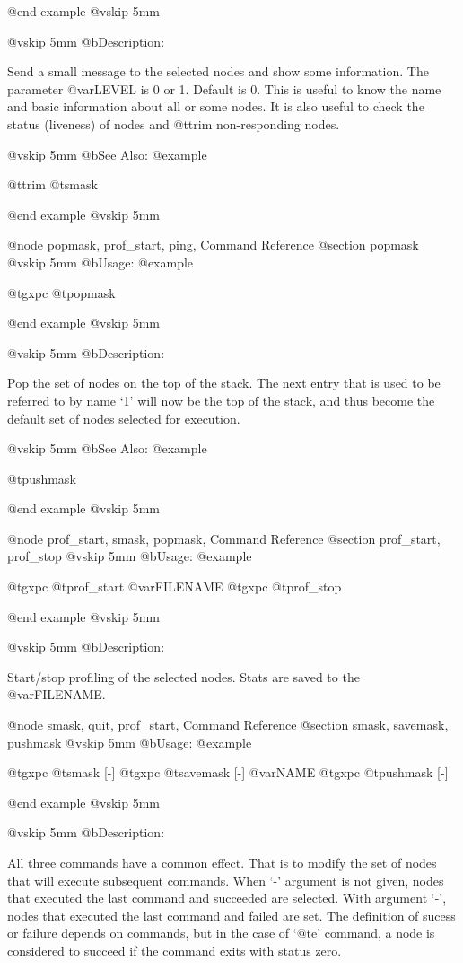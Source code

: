 @end example
@vskip 5mm

@vskip 5mm
@b{Description:}


  Send a small message to the selected nodes and show some
information. The parameter @var{LEVEL} is 0 or 1. Default is 0.
This is useful to know the name and basic information about
all or some nodes. It is also useful to check the status (liveness)
of nodes and @t{trim} non-responding nodes.

@vskip 5mm
@b{See Also:}
@example

  @t{trim} @t{smask}

@end example
@vskip 5mm

@node popmask, prof_start, ping, Command Reference
@section popmask
@vskip 5mm
@b{Usage:}
@example

  @t{gxpc} @t{popmask}

@end example
@vskip 5mm

@vskip 5mm
@b{Description:}


  Pop the set of nodes on the top of the stack. The next entry
that is used to be referred to by name `1' will now be the top
of the stack, and thus become the default set of nodes selected
for execution.

@vskip 5mm
@b{See Also:}
@example

  @t{pushmask}

@end example
@vskip 5mm

@node prof_start, smask, popmask, Command Reference
@section prof_start, prof_stop
@vskip 5mm
@b{Usage:}
@example

  @t{gxpc} @t{prof_start} @var{FILENAME}
  @t{gxpc} @t{prof_stop}

@end example
@vskip 5mm

@vskip 5mm
@b{Description:}


  Start/stop profiling of the selected nodes. Stats are saved to
the @var{FILENAME}.

@node smask, quit, prof_start, Command Reference
@section smask, savemask, pushmask
@vskip 5mm
@b{Usage:}
@example

  @t{gxpc} @t{smask}    [-]
  @t{gxpc} @t{savemask} [-] @var{NAME}
  @t{gxpc} @t{pushmask} [-]

@end example
@vskip 5mm

@vskip 5mm
@b{Description:}


  All three commands have a common effect. That is to modify the
set of nodes that will execute subsequent commands.  When `-'
argument is not given, nodes that executed the last command and
succeeded are selected. With argument `-', nodes that executed
the last command and failed are set. The definition of sucess or
failure depends on commands, but in the case of `@t{e}' command, a
node is considered to succeed if the command exits with status
zero.

